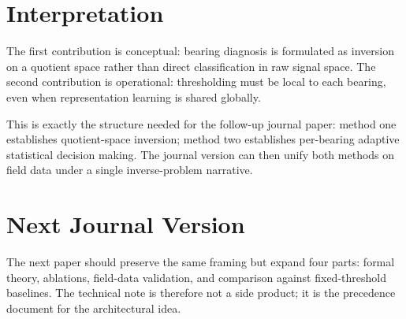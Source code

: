 \documentclass[11pt, letterpaper]{article}
\begin{document}
\section{Interpretation}

The first contribution is conceptual: bearing diagnosis is formulated as inversion on a quotient space rather than direct classification in raw signal space. The second contribution is operational: thresholding must be local to each bearing, even when representation learning is shared globally.

This is exactly the structure needed for the follow-up journal paper: method one establishes quotient-space inversion; method two establishes per-bearing adaptive statistical decision making. The journal version can then unify both methods on field data under a single inverse-problem narrative.

\section{Next Journal Version}

The next paper should preserve the same framing but expand four parts: formal theory, ablations, field-data validation, and comparison against fixed-threshold baselines. The technical note is therefore not a side product; it is the precedence document for the architectural idea.
\end{document}

